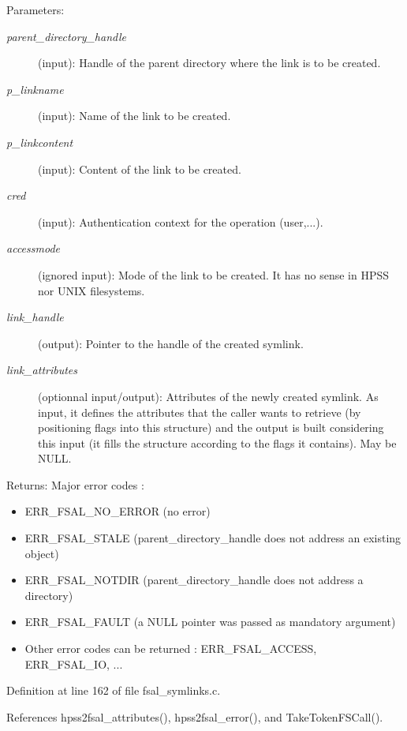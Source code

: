 \begin{Desc}
\item[Parameters:]
\begin{description}
\item[{\em parent\_\-directory\_\-handle}](input): Handle of the parent directory where the link is to be created. \item[{\em p\_\-linkname}](input): Name of the link to be created. \item[{\em p\_\-linkcontent}](input): Content of the link to be created. \item[{\em cred}](input): Authentication context for the operation (user,...). \item[{\em accessmode}](ignored input): Mode of the link to be created. It has no sense in HPSS nor UNIX filesystems. \item[{\em link\_\-handle}](output): Pointer to the handle of the created symlink. \item[{\em link\_\-attributes}](optionnal input/output): Attributes of the newly created symlink. As input, it defines the attributes that the caller wants to retrieve (by positioning flags into this structure) and the output is built considering this input (it fills the structure according to the flags it contains). May be NULL.\end{description}
\end{Desc}
\begin{Desc}
\item[Returns:]Major error codes :\begin{itemize}
\item ERR\_\-FSAL\_\-NO\_\-ERROR (no error)\item ERR\_\-FSAL\_\-STALE (parent\_\-directory\_\-handle does not address an existing object)\item ERR\_\-FSAL\_\-NOTDIR (parent\_\-directory\_\-handle does not address a directory)\item ERR\_\-FSAL\_\-FAULT (a NULL pointer was passed as mandatory argument)\item Other error codes can be returned : ERR\_\-FSAL\_\-ACCESS, ERR\_\-FSAL\_\-IO, ... \end{itemize}
\end{Desc}


Definition at line 162 of file fsal\_\-symlinks.c.

References hpss2fsal\_\-attributes(), hpss2fsal\_\-error(), and Take\-Token\-FSCall().